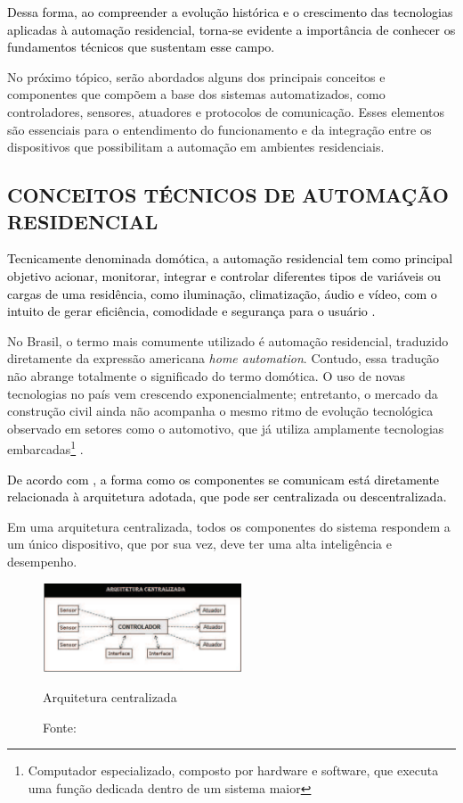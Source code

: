         \textcolor{black}{Dessa forma, ao compreender a evolução histórica e o crescimento das tecnologias aplicadas à automação residencial, torna-se evidente a importância de conhecer os fundamentos técnicos que sustentam esse campo.}

        No próximo tópico, serão abordados alguns dos principais conceitos e componentes que compõem a base dos sistemas automatizados, como controladores, sensores, atuadores e protocolos de comunicação. Esses elementos são essenciais para o entendimento do funcionamento e da integração entre os dispositivos que possibilitam a automação em ambientes residenciais.


    \subsection{CONCEITOS TÉCNICOS DE AUTOMAÇÃO RESIDENCIAL}
    
       \textcolor{black}{Tecnicamente denominada domótica, a automação residencial tem como principal objetivo acionar, monitorar, integrar e controlar diferentes tipos de variáveis ou cargas de uma residência, como iluminação, climatização, áudio e vídeo, com o intuito de gerar eficiência, comodidade e segurança para o usuário \cite{oliveira2019domotica}.}

       No Brasil, o termo mais comumente utilizado é automação residencial, traduzido diretamente da expressão americana \textit{home automation}. Contudo, essa tradução não abrange totalmente o significado do termo domótica. O uso de novas tecnologias no país vem crescendo exponencialmente; entretanto, o mercado da construção civil ainda não acompanha o mesmo ritmo de evolução tecnológica observado em setores como o automotivo, que já utiliza amplamente tecnologias embarcadas\footnote{Computador especializado, composto por hardware e software, que executa uma função dedicada dentro de um sistema maior} \cite{hipolito2018automaccao}.

       \textcolor{black}{De acordo com \cite{accardi2012automaccao}, a forma como os componentes se comunicam está diretamente relacionada à arquitetura adotada, que pode ser centralizada ou descentralizada.}

       Em uma arquitetura centralizada, todos os componentes do sistema respondem a um único dispositivo, que por sua vez, deve ter uma alta inteligência e desempenho.

        \begin{figure}[H]
                \centering
                \caption{ }  
                \centering
                \label{fig:cont}
                \includegraphics[width=0.53\textwidth]{imagens/arquiteturaCentralizada.png}
                \caption*{Arquitetura centralizada}
                \caption*{Fonte: \cite{hipolito2018automaccao}}
        \end{figure}

